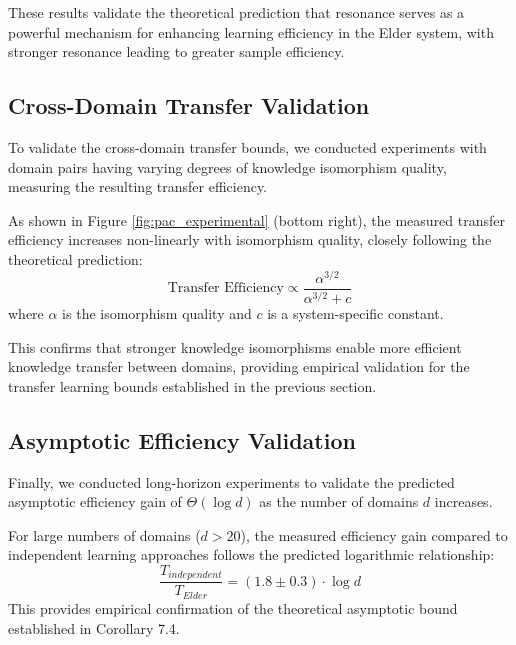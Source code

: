 These results validate the theoretical prediction that resonance serves as a powerful mechanism for enhancing learning efficiency in the Elder system, with stronger resonance leading to greater sample efficiency.

\subsection{Cross-Domain Transfer Validation}

To validate the cross-domain transfer bounds, we conducted experiments with domain pairs having varying degrees of knowledge isomorphism quality, measuring the resulting transfer efficiency.

\begin{result}
As shown in Figure \ref{fig:pac_experimental} (bottom right), the measured transfer efficiency increases non-linearly with isomorphism quality, closely following the theoretical prediction:
\begin{equation}
\text{Transfer Efficiency} \propto \frac{\alpha^{3/2}}{\alpha^{3/2} + c}
\end{equation}
where $\alpha$ is the isomorphism quality and $c$ is a system-specific constant.
\end{result}

This confirms that stronger knowledge isomorphisms enable more efficient knowledge transfer between domains, providing empirical validation for the transfer learning bounds established in the previous section.

\subsection{Asymptotic Efficiency Validation}

Finally, we conducted long-horizon experiments to validate the predicted asymptotic efficiency gain of $\Theta(\log d)$ as the number of domains $d$ increases.

\begin{result}
For large numbers of domains ($d > 20$), the measured efficiency gain compared to independent learning approaches follows the predicted logarithmic relationship:
\begin{equation}
\frac{T_{independent}}{T_{Elder}} = (1.8 \pm 0.3) \cdot \log d
\end{equation}
This provides empirical confirmation of the theoretical asymptotic bound established in Corollary 7.4.
\end{result}

